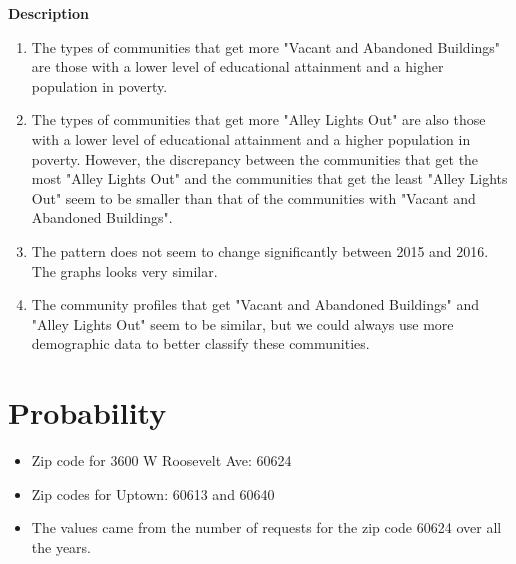 \documentclass[letterpaper,12pt]{article}
\begin{document}
\textbf{Description}
\begin{enumerate}
\item The types of communities that get more "Vacant and Abandoned Buildings" are those with a lower level of educational attainment and a higher population in poverty.
\item The types of communities that get more "Alley Lights Out" are also those with a lower level of educational attainment and a higher population in poverty. However, the discrepancy between the communities that get the most "Alley Lights Out" and the communities that get the least "Alley Lights Out" seem to be smaller than that of the communities with "Vacant and Abandoned Buildings".
\item The pattern does not seem to change significantly between 2015 and 2016. The graphs looks very similar.
\item The community profiles that get "Vacant and Abandoned Buildings" and "Alley Lights Out" seem to be similar, but we could always use more demographic data to better classify these communities.
\end{enumerate}


\newpage
\section{Probability}
\begin{itemize}
\item Zip code for 3600 W Roosevelt Ave: 60624
\item Zip codes for Uptown: 60613 and 60640
\item The values came from the number of requests for the zip code 60624 over all the years.
\end{itemize}
\end{document}
